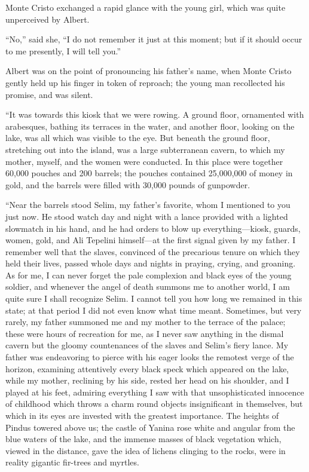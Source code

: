 Monte Cristo exchanged a rapid glance with the young girl, which was
quite unperceived by Albert.

“No,” said she, “I do not remember it just at this moment; but if it
should occur to me presently, I will tell you.”

Albert was on the point of pronouncing his father’s name, when Monte
Cristo gently held up his finger in token of reproach; the young man
recollected his promise, and was silent.

“It was towards this kiosk that we were rowing. A ground floor,
ornamented with arabesques, bathing its terraces in the water, and
another floor, looking on the lake, was all which was visible to the
eye. But beneath the ground floor, stretching out into the island, was
a large subterranean cavern, to which my mother, myself, and the women
were conducted. In this place were together 60,000 pouches and 200
barrels; the pouches contained 25,000,000 of money in gold, and the
barrels were filled with 30,000 pounds of gunpowder.

“Near the barrels stood Selim, my father’s favorite, whom I mentioned
to you just now. He stood watch day and night with a lance provided
with a lighted slowmatch in his hand, and he had orders to blow up
everything—kiosk, guards, women, gold, and Ali Tepelini himself—at the
first signal given by my father. I remember well that the slaves,
convinced of the precarious tenure on which they held their lives,
passed whole days and nights in praying, crying, and groaning. As for
me, I can never forget the pale complexion and black eyes of the young
soldier, and whenever the angel of death summons me to another world, I
am quite sure I shall recognize Selim. I cannot tell you how long we
remained in this state; at that period I did not even know what time
meant. Sometimes, but very rarely, my father summoned me and my mother
to the terrace of the palace; these were hours of recreation for me, as
I never saw anything in the dismal cavern but the gloomy countenances
of the slaves and Selim’s fiery lance. My father was endeavoring to
pierce with his eager looks the remotest verge of the horizon,
examining attentively every black speck which appeared on the lake,
while my mother, reclining by his side, rested her head on his
shoulder, and I played at his feet, admiring everything I saw with that
unsophisticated innocence of childhood which throws a charm round
objects insignificant in themselves, but which in its eyes are invested
with the greatest importance. The heights of Pindus towered above us;
the castle of Yanina rose white and angular from the blue waters of the
lake, and the immense masses of black vegetation which, viewed in the
distance, gave the idea of lichens clinging to the rocks, were in
reality gigantic fir-trees and myrtles.

